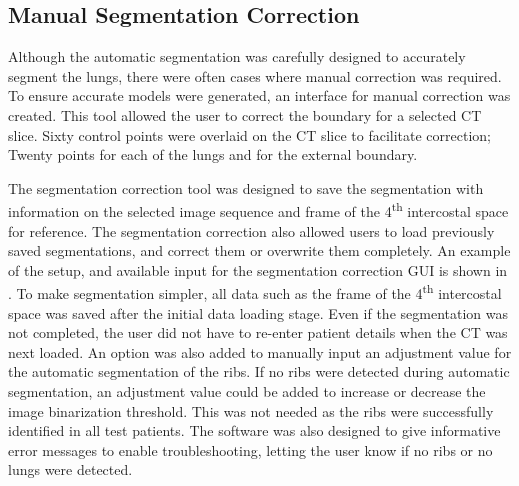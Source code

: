 \subsection{Manual Segmentation Correction}  \label{sec:correct-segment}
Although the automatic segmentation was carefully designed to accurately segment the 
lungs, there were often cases where manual correction was required. To ensure accurate
models were generated, an interface for manual correction was created. 
This tool allowed the user to correct the boundary for a selected CT slice. 
Sixty control points were overlaid on the CT slice to facilitate correction; 
Twenty points for each of the lungs and for the external 
boundary.

The segmentation correction tool was designed to save the segmentation with information
on the selected image sequence and frame of the 4\textsuperscript{th} intercostal space 
for reference. 
The segmentation correction also allowed users to load 
previously saved
segmentations, and correct them or overwrite them completely.
An example of the setup, and available input for the segmentation 
correction GUI is shown in .
To make segmentation simpler, all data such as the frame of the 4\textsuperscript{th}
intercostal space was saved after the initial data loading stage. Even if the segmentation 
was not completed, the user did not have to re-enter patient details when the CT was 
next loaded. 
An option was also added to manually input an adjustment value for the automatic
segmentation of the ribs. If no ribs were detected during automatic segmentation,
an adjustment value could be added to increase or decrease the image 
binarization threshold. 
This was not needed as the ribs were successfully identified in all test patients.
The software was also designed to give informative error messages 
to enable troubleshooting, letting the user know if no ribs or no lungs 
were detected. 

